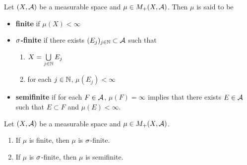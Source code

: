 \documentclass{book}
\begin{document}
	\begin{defn} 
		Let $(X, \mathcal{A})$ be a measurable space and $\mu \in M_+(X, \mathcal{A})$. Then $\mu$ is said to be 
		\begin{itemize}
			\item \textbf{finite} if $\mu(X) < \infty$
			\item \textbf{$\sigma$-finite} if there exists $(E_j)_{j \in \mathbb{N}} \subset \mathcal{A}$ such that 
			\begin{enumerate}
				\item $X = \bigcup\limits_{j \in \mathbb{N}} E_j$
				\item for each $j \in \mathbb{N}$, $\mu(E_j) < \infty$
			\end{enumerate}
			\item \textbf{semifinite} if for each $F \in \mathcal{A}$, $\mu(F) = \infty$ implies that there exists $E \in \mathcal{A}$ such that $E \subset F$ and $\mu(E) < \infty$.
		\end{itemize}
	\end{defn}

	\begin{ex} 
		Let $(X, \mathcal{A})$ be a measurable space and $\mu \in M_+(X, \mathcal{A})$.
		\begin{enumerate}
			\item If $\mu$ is finite, then $\mu$ is $\sigma$-finite. 
			\item If $\mu$ is $\sigma$-finite, then $\mu$ is semifinite.
		\end{enumerate}
	\end{ex}
\end{document}
